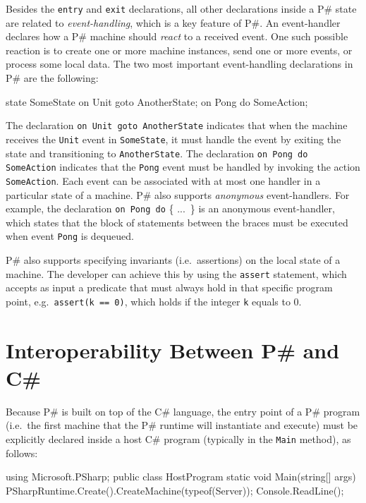 \documentclass{llncs}
\newcommand{\ps}{P\#\xspace}
\newcommand{\cs}{C\#\xspace}
\begin{document}
Besides the \texttt{entry} and \texttt{exit} declarations, all other declarations inside a \ps state are related to \emph{event-handling}, which is a key feature of \ps. An event-handler declares how a \ps machine should \emph{react} to a received event. One such possible reaction is to create one or more machine instances, send one or more events, or process some local data. The two most important event-handling declarations in \ps are the following:

\begin{psharpNoLines}
state SomeState {
  on Unit goto AnotherState;
  on Pong do SomeAction;
}
\end{psharpNoLines}

\noindent
The declaration \texttt{on Unit goto AnotherState} indicates that when the machine receives the \texttt{Unit} event in \texttt{SomeState}, it must handle the event by exiting the state and transitioning to \texttt{AnotherState}. The declaration \texttt{on Pong do SomeAction} indicates that the \texttt{Pong} event must be handled by invoking the action \texttt{SomeAction}. Each event can be associated with at most one handler in a particular state of a machine. \ps also supports \emph{anonymous} event-handlers. For example, the declaration \texttt{on Pong do} \{ ...\ \} is an anonymous event-handler, which states that the block of statements between the braces must be executed when event \texttt{Pong} is dequeued.

\ps also supports specifying invariants (i.e.\ assertions) on the local state of a machine. The developer can achieve this by using the \texttt{assert} statement, which accepts as input a predicate that must always hold in that specific program point, e.g.\ \texttt{assert(k == 0)}, which holds if the integer \texttt{k} equals to 0.

\section{Interoperability Between \ps and \cs}
\label{sec:interop}

Because \ps is built on top of the \cs language, the entry point of a \ps program (i.e.\ the first machine that the \ps runtime will instantiate and execute) must be explicitly declared inside a host \cs program (typically in the \texttt{Main} method), as follows:

\begin{psharpNoLines}
using Microsoft.PSharp;
public class HostProgram {
  static void Main(string[] args) {
    PSharpRuntime.Create().CreateMachine(typeof(Server));
    Console.ReadLine();
  }
}
\end{psharpNoLines}
\end{document}
